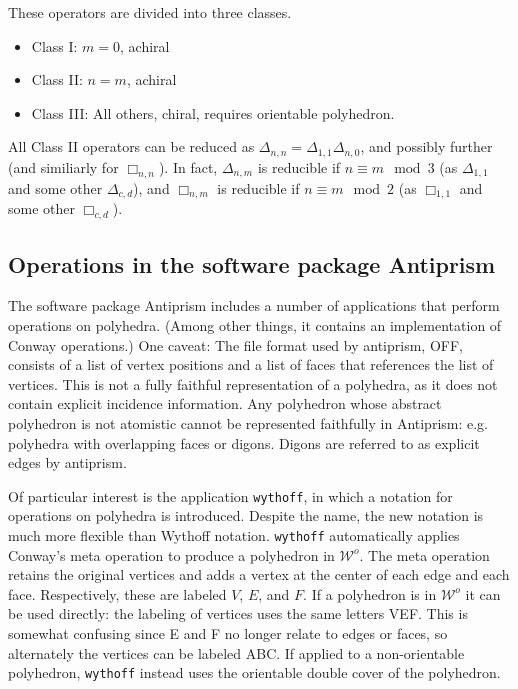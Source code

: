 \documentclass{amsart}[12pt]
\begin{document}
These operators are divided into three classes.
\begin{itemize}
  \item Class I: $m = 0$, achiral
  \item Class II: $n = m$, achiral
  \item Class III: All others, chiral, requires orientable polyhedron.
\end{itemize}
All Class II operators can be reduced as
$\Delta_{n,n} = \Delta_{1,1}\Delta_{n,0}$, and possibly further (and similiarly
for $\Box_{n,n}$). In fact, $\Delta_{n,m}$ is reducible if $n \equiv m \mod 3$
(as $\Delta_{1,1}$ and some other $\Delta_{c,d}$), and $\Box_{n,m}$ is
reducible if $n \equiv m \mod 2$ (as $\Box_{1,1}$ and some other $\Box_{c,d}$).

\subsection{Operations in the software package Antiprism}

The software package Antiprism \cite{antiprism} includes a number of
applications that perform operations on polyhedra. (Among other things, it
contains an implementation of Conway operations.) One caveat: The file format
used by antiprism, OFF, consists of a list of vertex positions and a list of
faces that references the list of vertices. This is not a fully faithful
representation of a polyhedra, as it does not contain explicit incidence
information. Any polyhedron whose abstract polyhedron is not atomistic cannot
be represented faithfully in Antiprism: e.g. polyhedra with overlapping faces
or digons. Digons are referred to as explicit edges by antiprism.

Of particular interest is the application \texttt{wythoff}, in which a notation
for operations on polyhedra is introduced. Despite the name, the new notation is
much more flexible than Wythoff notation. \texttt{wythoff} automatically
applies Conway's meta operation to produce a polyhedron in $\mathcal{W}^o$. The
meta operation retains the original vertices and adds a vertex at the center of
each edge and each face. Respectively, these are labeled $V$, $E$, and $F$. If
a polyhedron is in $\mathcal{W}^o$ it can be used directly: the labeling of
vertices uses the same letters VEF. This is somewhat confusing since E and F no
longer relate to edges or faces, so alternately the vertices can be labeled
ABC. If applied to a non-orientable polyhedron, \texttt{wythoff} instead uses
the orientable double cover of the polyhedron.
\end{document}

